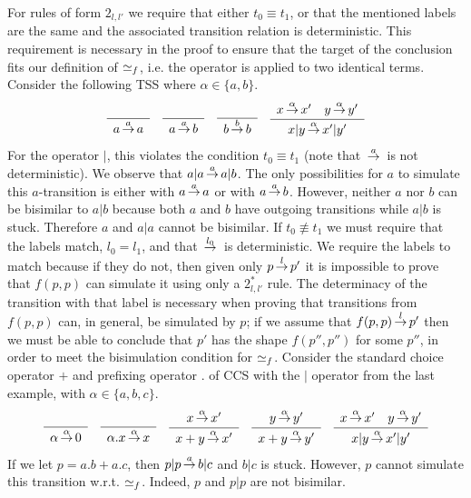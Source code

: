 %

For rules of form $2_{l,l'}$ we require that either $t_0\equiv t_1$, or that the mentioned labels are the same and the
associated transition
relation is deterministic. This requirement is necessary in the proof to ensure that the
target of the conclusion fits our definition of $\mathrel{\simeq_f}$, i.e. the operator is applied to two identical terms.
Consider the following TSS where $\alpha\in\{a,b\}$.
\[
    \sosrule{}{a\trans{a} a} \quad
    \sosrule{}{a\trans{a} b} \quad
    \sosrule{}{b\trans{b} b} \quad
    \sosrule{x\trans\alpha x' \quad y\trans\alpha y'}{x | y \trans\alpha x' | y'}
\]
For the operator $|$, this violates the condition $t_0\equiv t_1$ (note that $\,{\stackrel{{a}}{\rightarrow}}\,$ is not deterministic).
We observe that $a|a \,{\stackrel{{a}}{\rightarrow}}\, a|b$. The only possibilities for $a$ to simulate this $a$-transition
is either with $a\,{\stackrel{{a}}{\rightarrow}}\,a$
or with $a\,{\stackrel{{a}}{\rightarrow}}\,b$. However, neither $a$ nor $b$ can be bisimilar to $a|b$ because both $a$ and $b$ have outgoing
transitions while $a|b$ is stuck. Therefore $a$ and $a|a$ cannot be bisimilar.
%
If $t_0 \not\equiv t_1$ we must require that the labels match, $l_0 = l_1$, and that $\,{\stackrel{{l_0}}{\rightarrow}}\,$ is deterministic.
We require the labels to match because if they do not, then given only $p\,{\stackrel{{l}}{\rightarrow}}\,p'$ it is impossible to prove that $f(p,p)$
can simulate it using only a $2_{l,l'}^*$ rule. The determinacy of the transition with that label
is necessary when proving that transitions from $f(p,p)$ can, in general, be simulated by $p$;
if we assume that $f(p,p)\,{\stackrel{{l}}{\rightarrow}}\,p'$ then we must be able to conclude that $p'$ has the shape $f(p'',p'')$ for some $p''$,
in order to meet the bisimulation condition for $\mathrel{\simeq_f}$. Consider the standard choice operator $+$
and prefixing operator $.$ of CCS
with the $|$ operator from the last example, with $\alpha\in\{a,b,c\}$.
\[
    \sosrule{}{\alpha \trans{\alpha} 0} \quad
    \sosrule{}{\alpha.x \trans{\alpha} x} \quad
    \sosrule{x \trans{\alpha} x'}{x + y \trans{\alpha} x' } \quad \sosrule{y \trans{\alpha} y'}{x + y \trans{\alpha} y' } \quad
    \sosrule{x\trans\alpha x' \quad y\trans\alpha y'}{x | y \trans\alpha x' | y'}
\]
If we let $p = a.b + a.c$, then $p|p \,{\stackrel{{a}}{\rightarrow}}\, b|c$ and $b|c$ is stuck.
However, $p$ cannot simulate this transition w.r.t. $\mathrel{\simeq_f}$.
Indeed, $p$ and $p|p$ are not bisimilar.


